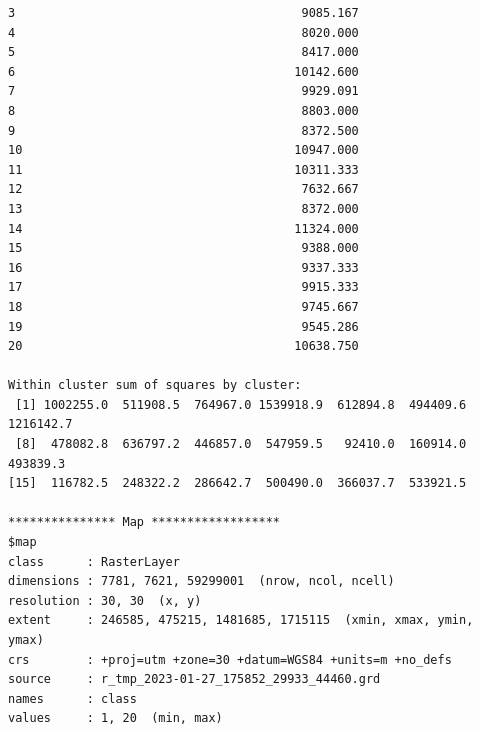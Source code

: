 \documentclass[12pt,a4paper,oneside]{article}
\begin{document}
\begin{scriptsize}
\begin{verbatim}
3                                        9085.167
4                                        8020.000
5                                        8417.000
6                                       10142.600
7                                        9929.091
8                                        8803.000
9                                        8372.500
10                                      10947.000
11                                      10311.333
12                                       7632.667
13                                       8372.000
14                                      11324.000
15                                       9388.000
16                                       9337.333
17                                       9915.333
18                                       9745.667
19                                       9545.286
20                                      10638.750

Within cluster sum of squares by cluster:
 [1] 1002255.0  511908.5  764967.0 1539918.9  612894.8  494409.6 1216142.7
 [8]  478082.8  636797.2  446857.0  547959.5   92410.0  160914.0  493839.3
[15]  116782.5  248322.2  286642.7  500490.0  366037.7  533921.5

*************** Map ******************
$map
class      : RasterLayer 
dimensions : 7781, 7621, 59299001  (nrow, ncol, ncell)
resolution : 30, 30  (x, y)
extent     : 246585, 475215, 1481685, 1715115  (xmin, xmax, ymin, ymax)
crs        : +proj=utm +zone=30 +datum=WGS84 +units=m +no_defs 
source     : r_tmp_2023-01-27_175852_29933_44460.grd 
names      : class 
values     : 1, 20  (min, max)
\end{verbatim}
\end{scriptsize}
\end{document}
